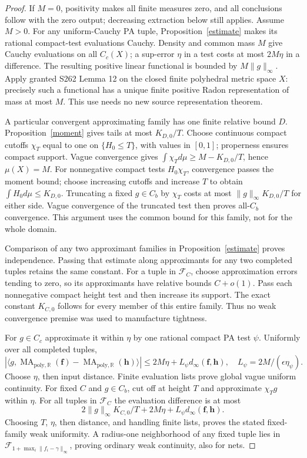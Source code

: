 \documentclass[11pt]{article}
\newcommand{\R}{\mathbb R}
\newcommand{\MA}{\operatorname{MA}_{\mathrm{poly},\R}}
\begin{document}
\begin{proof}
If $M=0$, positivity makes all finite measures zero, and all conclusions
follow with the zero output; decreasing extraction below still applies.
Assume $M>0$. For any uniform-Cauchy PA tuple, Proposition~\ref{estimate}
makes its rational compact-test evaluations Cauchy. Density and common
mass $M$ give Cauchy evaluations on all $C_c(X)$; a sup-error $\eta$
in a test costs at most $2M\eta$ in a difference. The resulting
positive linear functional is bounded by $M\|g\|_\infty$.
Apply granted S262 Lemma 12 on the closed finite polyhedral metric
space $X$: precisely such a functional has a unique finite positive
Radon representation of mass at most $M$. This use needs no new
source representation theorem.

A particular convergent approximating family has one finite relative
bound $D$. Proposition~\ref{moment} gives tails at most $K_{D,0}/T$.
Choose continuous compact cutoffs $\chi_T$ equal to one on
$\{H_0\leq T\}$, with values in $[0,1]$; properness ensures compact
support. Vague convergence gives
$\int\chi_Td\mu\geq M-K_{D,0}/T$, hence $\mu(X)=M$.
For nonnegative compact tests $H_0\chi_T$, convergence passes the
moment bound; choose increasing cutoffs and increase $T$ to obtain
$\int H_0d\mu\leq K_{D,0}$. Truncating a fixed $g\in C_b$ by
$\chi_T$ costs at most $\|g\|_\infty K_{D,0}/T$ for either side.
Vague convergence of the truncated test then proves all-$C_b$
convergence. This argument uses the common bound for this family,
not for the whole domain.

Comparison of any two approximant families in Proposition~\ref{estimate}
proves independence. Passing that estimate along approximants for
any two completed tuples retains the same constant. For a tuple in
$\mathcal F_C$, choose approximation errors tending to zero, so its
approximants have relative bounds $C+o(1)$. Pass each nonnegative
compact height test and then increase its support. The exact
constant $K_{C,0}$ follows for every member of this entire family.
Thus no weak convergence premise was used to manufacture tightness.

For $g\in C_c$ approximate it within $\eta$ by one rational compact
PA test $\psi$. Uniformly over all completed tuples,
\[
 |\langle g,\MA(\mathbf f)-\MA(\mathbf h)\rangle|
 \leq2M\eta+L_\psi d_\infty(\mathbf f,\mathbf h),\quad
 L_\psi=2M/(\epsilon\eta_\psi).
\]
Choose $\eta$, then input distance. Finite evaluation lists prove
global vague uniform continuity. For fixed $C$ and $g\in C_b$,
cut off at height $T$ and approximate $\chi_Tg$ within $\eta$.
For all tuples in $\mathcal F_C$ the evaluation difference is at most
\[
 2\|g\|_\infty K_{C,0}/T+2M\eta+L_\psi d_\infty(\mathbf f,\mathbf h).
\]
Choosing $T$, $\eta$, then distance, and handling finite lists,
proves the stated fixed-family weak uniformity. A radius-one
neighborhood of any fixed tuple lies in
$\mathcal F_{1+\max_i\|f_i-\gamma\|_\infty}$, proving ordinary weak
continuity, also for nets.


\end{proof}
\end{document}
